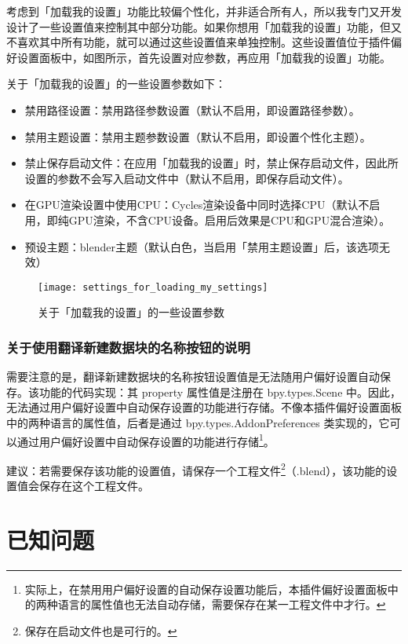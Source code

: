 \documentclass{../../public_resources/doc}
\begin{document}
考虑到「加载我的设置」功能比较偏个性化，并非适合所有人，所以我专门又开发设计了一些设置值来控制其中部分功能。如果你想用「加载我的设置」功能，但又不喜欢其中所有功能，就可以通过这些设置值来单独控制。这些设置值位于插件偏好设置面板中，如图所示，首先设置对应参数，再应用「加载我的设置」功能。

关于「加载我的设置」的一些设置参数如下：
\hypertarget{加载我的设置小节}{}
\begin{itemize}
    \item 禁用路径设置：禁用路径参数设置（默认不启用，即设置路径参数）。
    \item 禁用主题设置：禁用主题参数设置（默认不启用，即设置个性化主题）。
    \item 禁止保存启动文件：在应用「加载我的设置」时，禁止保存启动文件，因此所设置的参数不会写入启动文件中（默认不启用，即保存启动文件）。
    \item 在GPU渲染设置中使用CPU：Cycles渲染设备中同时选择CPU（默认不启用，即纯GPU渲染，不含CPU设备。启用后效果是CPU和GPU混合渲染）。
    \item 预设主题：blender主题（默认白色，当启用「禁用主题设置」后，该选项无效）
\end{itemize}

\begin{figure}[h!]
    \texttt{[image: settings\_for\_loading\_my\_settings]}
    \caption{关于「加载我的设置」的一些设置参数}
    \label{加载我的设置的设置参数}
\end{figure}

\subsubsection{关于使用翻译新建数据块的名称按钮的说明}
需要注意的是，翻译新建数据块的名称按钮设置值是无法随用户偏好设置自动保存。该功能的代码实现：其 property 属性值是注册在 bpy.types.Scene 中。因此，无法通过用户偏好设置中自动保存设置的功能进行存储。不像本插件偏好设置面板中的两种语言的属性值，后者是通过 bpy.types.AddonPreferences 类实现的，它可以通过用户偏好设置中自动保存设置的功能进行存储\footnote{实际上，在禁用用户偏好设置的自动保存设置功能后，本插件偏好设置面板中的两种语言的属性值也无法自动存储，需要保存在某一工程文件中才行。}。

建议：若需要保存该功能的设置值，请保存一个工程文件\footnote{保存在启动文件也是可行的。}（.blend），该功能的设置值会保存在这个工程文件。

\section{已知问题}
\end{document}
